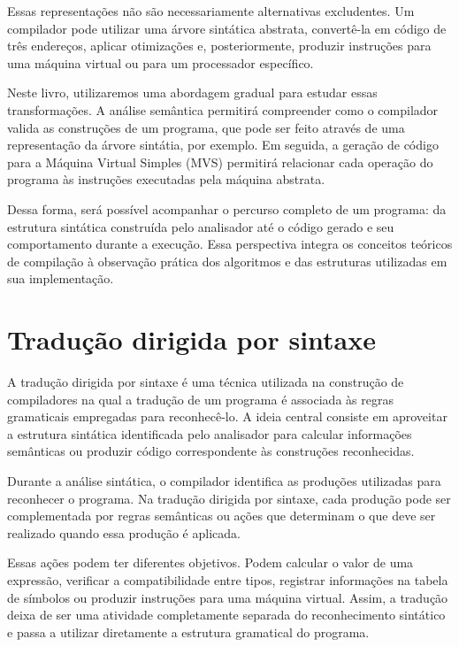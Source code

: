 \documentclass[
  brazilian,
  letterpaper,
]{book}
\theoremstyle{plain}
\theoremstyle{definition}
\theoremstyle{remark}
\begin{document}
Essas representações não são necessariamente alternativas excludentes.
Um compilador pode utilizar uma árvore sintática abstrata, convertê-la
em código de três endereços, aplicar otimizações e, posteriormente,
produzir instruções para uma máquina virtual ou para um processador
específico.

Neste livro, utilizaremos uma abordagem gradual para estudar essas
transformações. A análise semântica permitirá compreender como o
compilador valida as construções de um programa, que pode ser feito
através de uma representação da árvore sintátia, por exemplo. Em
seguida, a geração de código para a Máquina Virtual Simples (MVS)
permitirá relacionar cada operação do programa às instruções executadas
pela máquina abstrata.

Dessa forma, será possível acompanhar o percurso completo de um
programa: da estrutura sintática construída pelo analisador até o código
gerado e seu comportamento durante a execução. Essa perspectiva integra
os conceitos teóricos de compilação à observação prática dos algoritmos
e das estruturas utilizadas em sua implementação.

\section{Tradução dirigida por
sintaxe}\label{traduuxe7uxe3o-dirigida-por-sintaxe}

A tradução dirigida por sintaxe é uma técnica utilizada na construção de
compiladores na qual a tradução de um programa é associada às regras
gramaticais empregadas para reconhecê-lo. A ideia central consiste em
aproveitar a estrutura sintática identificada pelo analisador para
calcular informações semânticas ou produzir código correspondente às
construções reconhecidas.

Durante a análise sintática, o compilador identifica as produções
utilizadas para reconhecer o programa. Na tradução dirigida por sintaxe,
cada produção pode ser complementada por regras semânticas ou ações que
determinam o que deve ser realizado quando essa produção é aplicada.

Essas ações podem ter diferentes objetivos. Podem calcular o valor de
uma expressão, verificar a compatibilidade entre tipos, registrar
informações na tabela de símbolos ou produzir instruções para uma
máquina virtual. Assim, a tradução deixa de ser uma atividade
completamente separada do reconhecimento sintático e passa a utilizar
diretamente a estrutura gramatical do programa.
\end{document}
